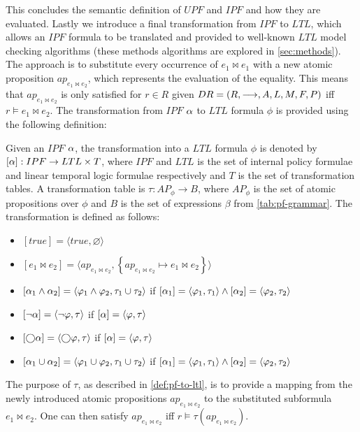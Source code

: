This concludes the semantic definition of $UPF$ and $IPF$ and how they are evaluated. Lastly we introduce a final transformation from $IPF$ to $LTL$, which allows an $IPF$ formula to be translated and provided to well-known $LTL$ model checking algorithms (these methods algorithms are explored in \autoref{sec:methods}). The approach is to substitute every occurrence of $e_1 \bowtie e_1$ with a new atomic proposition $ap_{e_1 \bowtie e_2}$, which represents the evaluation of the equality. This means that $ap_{e_1 \bowtie e_2}$ is only satisfied for $r \in R$ given $DR= \left( R, \longrightarrow, A, L, M, F, P \right)$ iff $r \models e_1 \bowtie e_2$. The transformation from $IPF$ $\alpha$ to $LTL$ formula $\phi$ is provided using the following definition:
\begin{definition}\label{def:pf-to-ltl}
Given an $IPF$ $\alpha$, the transformation into a $LTL$ formula $\phi$ is denoted by $[\alpha] : IPF \rightarrow LTL \times T$, where $IPF$ and $LTL$ is the set of internal policy formulae and linear temporal logic formulae respectively and $T$ is the set of transformation tables. A transformation table is $\tau : AP_\phi \rightarrow B$, where $AP_\phi$ is the set of atomic propositions over $\phi$ and $B$ is the set of expressions $\beta$ from \autoref{tab:pf-grammar}. The transformation is defined as follows:
\begin{itemize}
    \item $[true] = \langle true, \varnothing \rangle$
    \item $[e_1 \bowtie e_2] = \langle ap_{e_1 \bowtie e_2}, \left\{ ap_{e_1 \bowtie e_2} \mapsto e_1 \bowtie e_2 \right\} \rangle$
    \item $[\alpha_1 \land \alpha_2] = \langle \varphi_1 \land \varphi_2, \tau_1 \cup \tau_2 \rangle$ if $[\alpha_1] = \langle \varphi_1, \tau_1 \rangle \land [\alpha_2] = \langle \varphi_2, \tau_2 \rangle$
    \item $[\lnot \alpha] = \langle \lnot \varphi, \tau \rangle$ if $[\alpha] = \langle \varphi, \tau \rangle$
    \item $[\bigcirc \alpha] = \langle \bigcirc \varphi, \tau \rangle$ if $[\alpha] = \langle \varphi, \tau \rangle$
    \item $[\alpha_1 \cup \alpha_2] = \langle \varphi_1 \cup \varphi_2, \tau_1 \cup \tau_2 \rangle$ if $[\alpha_1] = \langle \varphi_1, \tau_1 \rangle \land [\alpha_2] = \langle \varphi_2, \tau_2 \rangle$
\end{itemize}
\end{definition}
The purpose of $\tau$, as described in \autoref{def:pf-to-ltl}, is to provide a mapping from the newly introduced atomic propositions $ap_{e_1 \bowtie e_2}$ to the substituted subformula $e_1 \bowtie e_2$. One can then satisfy $ap_{e_1 \bowtie e_2}$ iff $r \models \tau(ap_{e_1 \bowtie e_2})$.